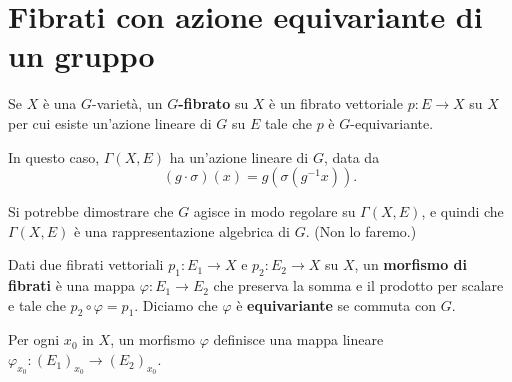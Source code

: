 \section{Fibrati con azione equivariante di un gruppo}

\begin{definition}
    Se $X$ è una $G$-varietà, un \textbf{$G$-fibrato} su $X$ è un fibrato vettoriale $p\colon E \to X$ su $X$ per cui esiste un'azione lineare di $G$ su $E$ tale che $p$ è $G$-equivariante.
\end{definition}
\begin{remark}
In questo caso, $\Gamma(X,E)$ ha un'azione lineare di $G$, data da 
\[(g\cdot \sigma)(x)=g(\sigma(g^{-1}x)).\] 
\end{remark}

Si potrebbe dimostrare che $G$ agisce in modo regolare su $\Gamma(X,E)$, e quindi che $\Gamma(X,E)$ è una rappresentazione algebrica di $G$. (Non lo faremo.) 

\begin{definition}
    Dati due fibrati vettoriali $p_1\colon E_1 \to X$ e $p_2\colon E_2 \to X$ su $X$, un \textbf{morfismo di fibrati} è una mappa $\varphi\colon E_1 \to E_2$ che preserva la somma e il prodotto per scalare e tale che $p_2\circ\varphi=p_1$. Diciamo che $\varphi$ è \textbf{equivariante} se commuta con $G$.
\end{definition}

\begin{remark}
Per ogni $x_0$ in $X$, un morfismo $\varphi$ definisce una mappa lineare $\varphi_{x_0}\colon (E_1)_{x_0}\to (E_2)_{x_0}$. 
\end{remark}

